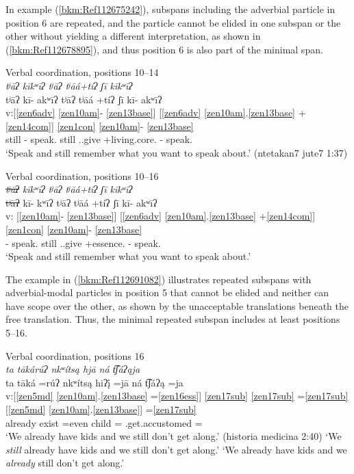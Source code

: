 \documentclass[output=paper]{langscibook}
\begin{document}
In example (\ref{bkm:Ref112675242}), subspans including the adverbial particle in position 6 are repeated, and the particle cannot be elided in one subspan or the other without yielding a different interpretation, as shown in (\ref{bkm:Ref112678895}), and thus position 6 is also part of the minimal span.


\ea\label{bkm:Ref112675242}Verbal coordination, positions 10{}--14\\
\textit{ tʲāʔ kīkʷīʔ tʲāʔ tʲāá+tíʔ ʃī kīkʷīʔ}\\
\glll tʲāʔ kī- akʷīʔ tʲāʔ tʲāá +tíʔ ʃī kī- akʷīʔ\\
v:[\ref{zen6adv} \ref{zen10am}{}- \ref{zen13base}] [\ref{zen6adv} \ref{zen10am}.\ref{zen13base} +\ref{zen14com}] \ref{zen1con} \ref{zen10am}{}- \ref{zen13base} \\
still \Pot{}- speak.\Second\Sg{} still \Pot.\Iter{}.give +living.core.\Second\Sg{} \Conj{} \Pot{}- speak.\Second\Sg{} \\
\glt `Speak and still remember what you want to speak about.' (ntetakan7 jute7 1:37)
\z


\ea\label{bkm:Ref112678895}Verbal coordination, positions 10--16 \\
    \textit{ \sout{tʲāʔ} kīkʷīʔ tʲāʔ tʲāá+tíʔ ʃī kīkʷīʔ} \\ 
    \glll {} \sout{tʲāʔ} kī- kʷīʔ tʲāʔ tʲāá +tíʔ ʃī kī- akʷīʔ\\
    v: {} [\ref{zen10am}{}- \ref{zen13base}] [\ref{zen6adv} \ref{zen10am}.\ref{zen13base} +\ref{zen14com}] \ref{zen1con} \ref{zen10am}{}- \ref{zen13base} \\
    {} {} \Pot{}- speak.\Second\Sg{} still \Pot.\Iter{}.give +essence.\Second\Sg{} \Conj{} \Pot{}- speak.\Second\Sg{} \\
    \glt `Speak and still remember what you want to speak about.'
\z 

The example in (\ref{bkm:Ref112691082}) illustrates repeated subspans with adverbial-modal particles in position 5 that cannot be elided and neither can have scope over the other, as shown by the unacceptable translations beneath the free translation. Thus, the minimal repeated subspan includes at least positions 5{}--16.

\ea\label{bkm:Ref112691082}Verbal coordination, positions 16\\
\textit{ta tākárúʔ nkʷítsą hjā ná t͡ʃáʔąja}\\
\glll ta tāká =rúʔ nkʷítsą hiʔį̄ =jā ná t͡ʃáʔą =ja\\
v:[\ref{zen5md} \ref{zen10am}.\ref{zen13base} =\ref{zen16ess}] \ref{zen17sub} \ref{zen17sub} =\ref{zen17sub} [\ref{zen5md} \ref{zen10am}.\ref{zen13base}] =\ref{zen17sub} \\
already exist =even child \Gen{} =\First\Excl{} \Neg{} \Pot{}.get.accustomed =\First\Excl{} \\
\glt `We already have kids and we still don't get along.' (historia medicina 2:40)
\glt *`We \textit{still} already have kids and we still don't get along.'
\glt *`We already have kids and we \textit{already} still don't get along.'
\z
\end{document}
